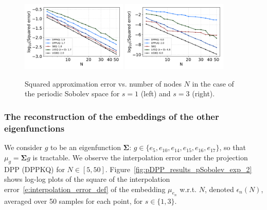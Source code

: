 \documentclass[twoside,11pt]{book}
\numberwithin{theorem}{chapter}
\numberwithin{definition}{chapter}
\numberwithin{proposition}{chapter}
\numberwithin{corollary}{chapter}
\numberwithin{example}{chapter}
\numberwithin{lemma}{chapter}
\numberwithin{assumption}{chapter}
\numberwithin{equation}{chapter}
\numberwithin{figure}{chapter}
\begin{document}
\begin{figure}
\centering
\includegraphics[width=0.45\textwidth]{img/neurips/Sobolev/Sobolev_kernel_order_1_fig_1.pdf}
\includegraphics[width=0.45\textwidth]{img/neurips/Sobolev/Sobolev_kernel_order_3_fig_1.pdf}\\
\caption{Squared approximation error vs. number of nodes $N$ in the case of the periodic Sobolev space for $s = 1$ (left) and $s=3$ (right).
\label{fig:pDPP_results_pSobolev_exp_1}}
\end{figure}


\subsubsection{The reconstruction of the embeddings of the other eigenfunctions}
We consider $g$ to be an eigenfunction $\bm{\Sigma}$: $g \in \{e_{5},e_{10},e_{14},e_{15},e_{16},e_{17}\}$, so that $\mu_{g} = \bm{\Sigma}g$ is tractable. We observe the interpolation error under the projection DPP (DPPKQ) for $N \in [5,50]$. Figure~\ref{fig:pDPP_results_pSobolev_exp_2} shows log-log plots of the square of the interpolation error~\eqref{e:interpolation_error_def} of the embedding $\mu_{e_{n}}$ w.r.t. $N$, denoted $\epsilon_{n}(N)$, averaged over 50 samples for each point, for $s \in \{1,3\}$. 
\end{document}
